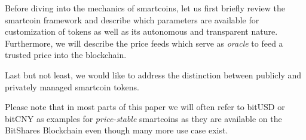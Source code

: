 Before diving into the mechanics of smartcoins, let us first briefly
review the smartcoin framework and describe which parameters are
available for customization of tokens as well as its autonomous and
transparent nature. Furthermore, we will describe the price feeds which serve
as \emph{oracle} to feed a trusted price into the blockchain.

Last but not least, we would like to address the distinction between publicly
and privately managed smartcoin tokens.

Please note that in most parts of this paper we will often refer to bitUSD or
bitCNY as examples for \emph{price-stable} smartcoins as they are available on
the BitShares Blockchain even though many more use case exist.
